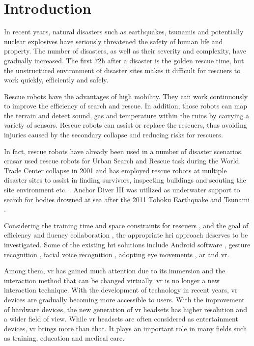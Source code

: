 \chapter{Introduction}

In recent years, natural disasters such as earthquakes, tsunamis and potentially nuclear explosives have seriously threatened the safety of human life and property. The number of disasters, as well as their severity and complexity, have gradually increased. The first 72h after a disaster is the golden rescue time, but the unstructured environment of disaster sites makes it difficult for rescuers to work quickly, efficiently and safely.

Rescue robots have the advantages of high mobility. They can work continuously to improve the efficiency of search and rescue. In addition, those robots can map the terrain and detect sound, gas and temperature within the ruins by carrying a variety of sensors.
Rescue robots can assist or replace the rescuers, thus avoiding injuries caused by the secondary collapse and reducing risks for rescuers. 


In fact, rescue robots have already been used in a number of disaster scenarios. 
\gls{crasar} used rescue robots for Urban Search and Rescue task during the World Trade Center collapse in 2001 \cite{Casper:2003tk} and has employed rescue robots at multiple disaster sites to assist in finding survivors, inspecting buildings and scouting the site environment etc. \cite{Murphy:2012th}. Anchor Diver III was utilized as underwater support to search for bodies drowned at sea after the 2011 Tohoku Earthquake and Tsunami \cite{Huang:2011wq}.

Considering the training time and space constraints for rescuers \cite{Murphy:2004wl}, and the goal of efficiency and ﬂuency collaboration \cite{10.1145/1228716.1228718}, the appropriate \gls{hri} approach deserves to be investigated. Some of the existing \gls{hri} solutions include Android software \cite{Sarkar:2017tt} \cite{Faisal:2019uu}, gesture recognition\cite{Sousa:2017tn} \cite{10.1145/2157689.2157818} \cite{Nagi:2014vu}, facial voice recognition \cite{Pourmehr:2013ta}, adopting eye movements \cite{Ma:2015wu}, \gls{ar} \cite{SOARES20151656} and \gls{vr}.

Among them, \gls{vr} has gained much attention due to its immersion and the interaction method that can be changed virtually. \gls{vr} is no longer a new interaction technique. With the development of technology in recent years, \gls{vr} devices are gradually becoming more accessible to users. With the improvement of hardware devices, the new generation of \gls{vr} headsets has higher resolution and a wider field of view. While \gls{vr} headsets are often considered as entertainment devices, \gls{vr} brings more than that. It plays an important role in many fields such as training, education and medical care.

